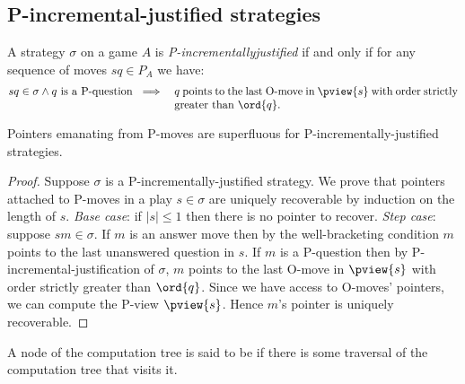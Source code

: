 \subsection{P-incremental-justified strategies}
\begin{definition}
A strategy $\sigma$ on a game $A$ is
\emph{P-incrementally\-justified} if and only if for any sequence of
moves $s q \in P_A$ we have:
\begin{eqnarray*}
s q \in \sigma \wedge q \mbox{ is a P-question } &\implies&
\parbox[t]{9cm}{$q$  points to the last O-move in $\pview{s}$
with order strictly greater than $\ord{q}$.}
\end{eqnarray*}
\end{definition}




\begin{lemma}
\label{lem:incrjustified_pointers_uniqu_recover} Pointers emanating
from P-moves are superfluous for P-incrementally-justified
strategies.
\end{lemma}
\begin{proof}
Suppose $\sigma$ is a P-incrementally-justified strategy. We prove
that pointers attached to P-moves in a play $s\in \sigma$ are
uniquely recoverable by induction on the length of $s$. \noindent
\emph{Base case}: if $|s| \leq 1$ then there is no pointer to
recover. \noindent \emph{Step case}: suppose $s m \in \sigma$. If
$m$ is an answer move then by the well-bracketing condition $m$
points to the last unanswered question in $s$. If $m$ is a
P-question then by  P-incremental-justification of $\sigma$, $m$
points to the last O-move in $\pview{s}$ with order strictly greater
than $\ord{q}$. Since we have access to O-moves' pointers, we can
compute the P-view $\pview{s}$. Hence $m$'s pointer is uniquely
recoverable.
\end{proof}





A node of the computation tree is said to be  if
there is some traversal of the computation tree that visits it.

